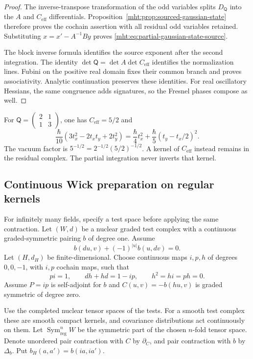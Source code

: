 \begin{proof}
The inverse-transpose transformation of the odd variables
splits $D_{\mathsf Q}$ into the $A$ and $C_{\mathrm{eff}}$
differentials. Proposition~\ref{mht:prop:sourced-gaussian-state}
therefore proves the cochain assertion with all residual odd
variables retained. Substituting $x=x'-A^{-1}By$ proves
\eqref{mht:eq:partial-gaussian-state-source}.

The block inverse formula identifies the source exponent
after the second integration. The identity
$\det\mathsf Q=\det A\det C_{\mathrm{eff}}$ identifies the
normalization lines. Fubini on the positive real domain fixes
their common branch and proves associativity.
Analytic continuation preserves these identities.
For real oscillatory Hessians, the same congruence adds
signatures, so the Fresnel phases compose as well.
\end{proof}

For $\mathsf Q=\left(\begin{smallmatrix}2&1\\1&3\end{smallmatrix}\right)$,
one has $C_{\mathrm{eff}}=5/2$ and
\[
 \frac\hbar{10}(3t_x^2-2t_xt_y+2t_y^2)
       =\frac\hbar4t_x^2+\frac\hbar5(t_y-t_x/2)^2.
\]
The vacuum factor is $5^{-1/2}=2^{-1/2}(5/2)^{-1/2}$.
A kernel of $C_{\mathrm{eff}}$ instead remains in the residual
complex. The partial integration never inverts that kernel.

\subsection{Continuous Wick preparation on regular kernels}

For infinitely many fields, specify a test space before applying
the same contraction. Let $(W,d)$ be a nuclear graded test
complex with a continuous graded-symmetric pairing $b$ of
degree one. Assume
\[
 b(du,v)+(-1)^{|u|}b(u,dv)=0.
\]
Let $(H,d_H)$ be finite-dimensional. Choose continuous maps
$i,p,h$ of degrees $0,0,-1$, with $i,p$ cochain maps, such that
\[
 pi=1,\qquad dh+hd=1-ip,\qquad h^2=hi=ph=0.
\]
Assume $P=ip$ is self-adjoint for $b$ and
$C(u,v)=-b(hu,v)$ is graded symmetric of degree zero.

Use the completed nuclear tensor spaces of the tests.
For a smooth test complex these are smooth compact kernels,
and covariance distributions act continuously on them.
Let $\operatorname{Sym}_{\mathrm{reg}}^nW$ be the symmetric
part of the chosen $n$-fold tensor space. Denote unordered
pair contraction with $C$ by $\partial_C$, and pair contraction
with $b$ by $\Delta_b$. Put $b_H(a,a')=b(ia,ia')$.

